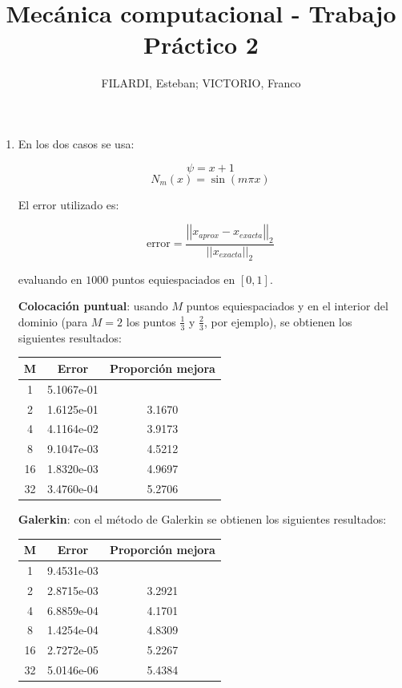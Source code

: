 \documentclass{article}
\title{\textbf{Mecánica computacional - Trabajo Práctico 2}}
\author{FILARDI, Esteban; VICTORIO, Franco}
\date{}
\begin{document}
\maketitle

\begin{enumerate}[1)]
    \item{ %
        En los dos casos se usa:

        \[ \psi = x + 1 \]
        \[ N_m(x) = \sin(m \pi x) \]

        El error utilizado es:

        \[ \mbox{error} = \frac{\left|\left| x_{aprox} - x_{exacta}\right|\right|_2}{\left|\left| x_{exacta} \right|\right|_2} \]

        evaluando en $1000$ puntos equiespaciados en $[0, 1]$.

        \vspace{0.5cm}

        \textbf{Colocación puntual}: usando $M$ puntos equiespaciados
        y en el interior del dominio (para $M=2$ los puntos 
        $\frac{1}{3}$ y $\frac{2}{3}$, por ejemplo), se obtienen los
        siguientes resultados:

        \begin{tabular}{|c|c|c|}
        \hline
        \textbf{M} & \textbf{Error} & \textbf{Proporción mejora} \\
        \hline
        1 & 5.1067e-01 & \\
        \hline
        2 & 1.6125e-01 & 3.1670 \\
        \hline
        4 & 4.1164e-02 & 3.9173 \\
        \hline
        8 & 9.1047e-03 & 4.5212 \\
        \hline
        16 & 1.8320e-03 & 4.9697 \\
        \hline
        32 & 3.4760e-04 & 5.2706 \\
        \hline
        \end{tabular}

        \vspace{0.5cm}

        \textbf{Galerkin}: con el método de Galerkin se obtienen
        los siguientes resultados:

        \begin{tabular}{|c|c|c|}
        \hline
        \textbf{M} & \textbf{Error} & \textbf{Proporción mejora} \\
        \hline
        1 & 9.4531e-03 & \\
        \hline
        2 & 2.8715e-03 & 3.2921 \\
        \hline
        4 & 6.8859e-04 & 4.1701 \\
        \hline
        8 & 1.4254e-04 & 4.8309 \\
        \hline
        16 & 2.7272e-05 & 5.2267 \\
        \hline
        32 & 5.0146e-06 & 5.4384 \\
        \hline
        \end{tabular}

}
\end{enumerate}
\end{document}
